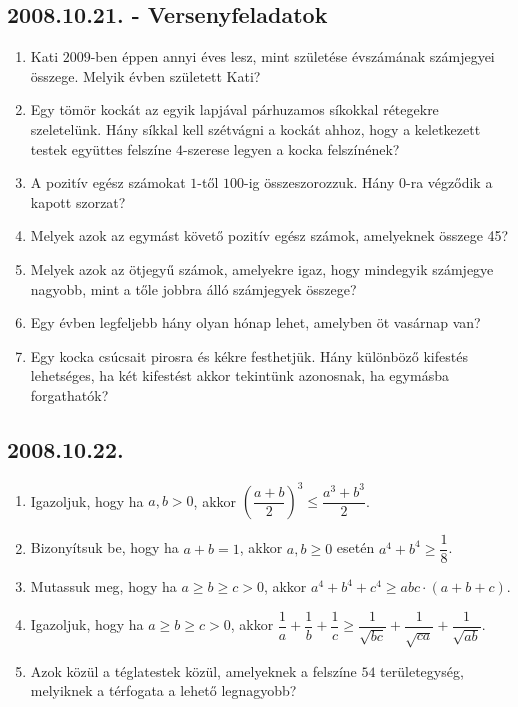\subsection*{2008.10.21. - Versenyfeladatok}
\begin{enumerate}
\item Kati $2009$-ben éppen annyi éves lesz, mint születése évszámának számjegyei összege. Melyik évben született Kati?
\item Egy tömör kockát az egyik lapjával párhuzamos síkokkal rétegekre szeletelünk. Hány síkkal kell szétvágni a kockát ahhoz, hogy a keletkezett testek együttes felszíne $4$-szerese legyen a kocka felszínének?
\item A pozitív egész számokat $1$-től $100$-ig összeszorozzuk. Hány $0$-ra végződik a kapott szorzat?
\item Melyek azok az egymást követő pozitív egész számok, amelyeknek összege 45? 
\item Melyek azok az ötjegyű számok, amelyekre igaz, hogy mindegyik számjegye nagyobb, mint a tőle jobbra álló számjegyek összege?
\item Egy évben legfeljebb hány olyan hónap lehet, amelyben öt vasárnap van?
\item Egy kocka csúcsait pirosra és kékre festhetjük. Hány különböző kifestés lehetséges, ha két kifestést akkor tekintünk azonosnak, ha egymásba forgathatók?
\end{enumerate}
\subsection*{2008.10.22.}
\begin{enumerate}
\item Igazoljuk, hogy ha $a,b>0$, akkor $\left(\dfrac{a+b}{2}\right)^3\leq \dfrac{a^3+b^3}{2}$.  
\item Bizonyítsuk be, hogy ha $a+b=1$, akkor $a,b\geq 0$ esetén $a^4+b^4\geq \dfrac{1}{8}$.
\item Mutassuk meg, hogy ha $a\geq b\geq c>0$, akkor $a^4+b^4+c^4\geq abc\cdot(a+b+c)$.
\item Igazoljuk, hogy ha $a\geq b\geq c>0$, akkor $\dfrac{1}{a}+\dfrac{1}{b}+\dfrac{1}{c}\geq \dfrac{1}{\sqrt{bc}}+\dfrac{1}{\sqrt{ca}}+\dfrac{1}{\sqrt{ab}}$.
\item Azok közül a téglatestek közül, amelyeknek a felszíne $54$ területegység, melyiknek a térfogata a lehető legnagyobb?
\end{enumerate}
